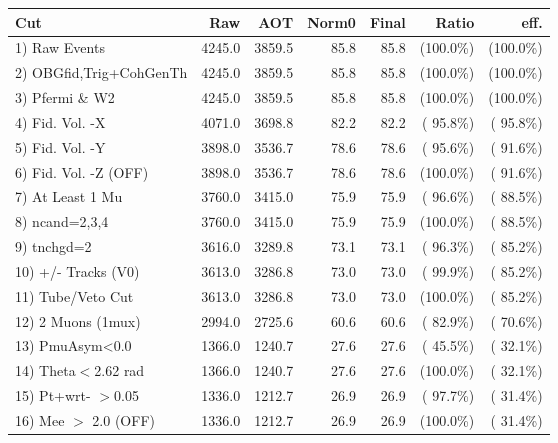  \begin{table}[h!]\centering
 \begin{tabular}{||l||r|r|r|r|r|r||}
 \hline
 \hline
 Cut & Raw & AOT & Norm0 & Final & Ratio & eff.       \\
 \hline
  1) Raw Events           &       4245.0 &       3859.5 &         85.8 &         85.8 & (100.0\%) & (100.0\%) \\
  2) OBGfid,Trig+CohGenTh &       4245.0 &       3859.5 &         85.8 &         85.8 & (100.0\%) & (100.0\%) \\
  3) Pfermi \& W2         &       4245.0 &       3859.5 &         85.8 &         85.8 & (100.0\%) & (100.0\%) \\
  4) Fid. Vol. -X         &       4071.0 &       3698.8 &         82.2 &         82.2 & ( 95.8\%) & ( 95.8\%) \\
  5) Fid. Vol. -Y         &       3898.0 &       3536.7 &         78.6 &         78.6 & ( 95.6\%) & ( 91.6\%) \\
  6) Fid. Vol. -Z (OFF)   &       3898.0 &       3536.7 &         78.6 &         78.6 & (100.0\%) & ( 91.6\%) \\
  7) At Least 1 Mu        &       3760.0 &       3415.0 &         75.9 &         75.9 & ( 96.6\%) & ( 88.5\%) \\
  8) ncand=2,3,4          &       3760.0 &       3415.0 &         75.9 &         75.9 & (100.0\%) & ( 88.5\%) \\
  9) tnchgd=2             &       3616.0 &       3289.8 &         73.1 &         73.1 & ( 96.3\%) & ( 85.2\%) \\
 10) +/- Tracks (V0)      &       3613.0 &       3286.8 &         73.0 &         73.0 & ( 99.9\%) & ( 85.2\%) \\
 11) Tube/Veto Cut        &       3613.0 &       3286.8 &         73.0 &         73.0 & (100.0\%) & ( 85.2\%) \\
 12) 2 Muons (1mux)       &       2994.0 &       2725.6 &         60.6 &         60.6 & ( 82.9\%) & ( 70.6\%) \\
 13) PmuAsym<0.0          &       1366.0 &       1240.7 &         27.6 &         27.6 & ( 45.5\%) & ( 32.1\%) \\
 14) Theta$<$2.62 rad     &       1366.0 &       1240.7 &         27.6 &         27.6 & (100.0\%) & ( 32.1\%) \\
 15) Pt+wrt- $>$0.05      &       1336.0 &       1212.7 &         26.9 &         26.9 & ( 97.7\%) & ( 31.4\%) \\
 16) Mee $>$ 2.0  (OFF)   &       1336.0 &       1212.7 &         26.9 &         26.9 & (100.0\%) & ( 31.4\%) \\

\end{tabular}
\end{table}

